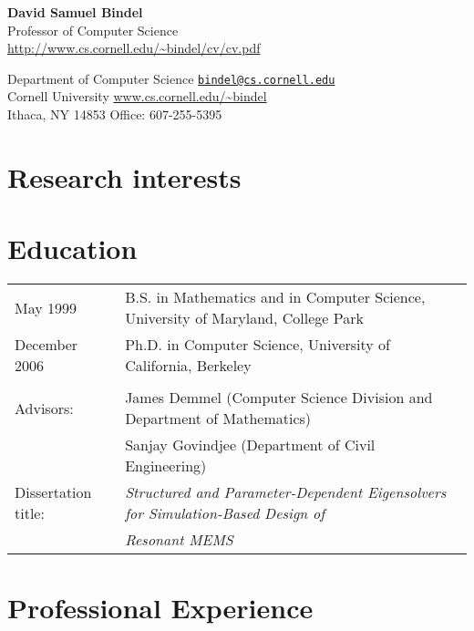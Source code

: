 \documentclass{article}
\begin{document}
\begin{center}
  {\Large \bf David Samuel Bindel} \\
  Professor of Computer Science \\
  \url{http://www.cs.cornell.edu/~bindel/cv/cv.pdf}
\end{center}

\begin{trivlist}
\item
Department of Computer Science
  \hfill \href{mail:bindel@cs.cornell.edu}{\tt bindel@cs.cornell.edu} \\
Cornell University
  \hfill \url{www.cs.cornell.edu/~bindel} \\
Ithaca, NY 14853
  \hfill Office: 607-255-5395
\end{trivlist}


\section*{Research interests}



\section*{Education}

\begin{tabular}{ll}
May 1999 &
  B.S. in Mathematics and in Computer Science,
  University of Maryland, College Park \\
December 2006 &
  Ph.D. in Computer Science, University of California, Berkeley
\\
\\
Advisors:
 & James Demmel (Computer Science Division and Department of Mathematics) \\
 & Sanjay Govindjee (Department of Civil Engineering) \\
Dissertation title: &
   {\em Structured and Parameter-Dependent Eigensolvers for
        Simulation-Based Design of} \\
&  {\em Resonant MEMS}
\end{tabular}


\section*{Professional Experience}
\end{document}
